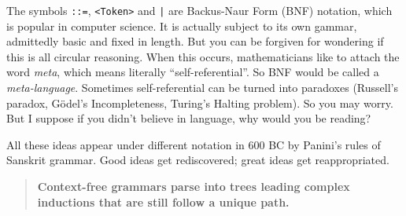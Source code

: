 \begin{remark}
The symbols \lstinline{::=}, \lstinline{<Token>} and \lstinline{|} are 
Backus-Naur Form (BNF) notation, which is popular 
in computer science.  It is actually subject to its own gammar, admittedly 
basic and fixed in length.  But you can be forgiven for wondering if this is 
all circular reasoning.  When this occurs, mathematicians like to attach 
the word \emph{meta}, which means literally ``self-referential''.
So BNF would be called a \emph{meta-language}. Sometimes self-referential 
can be turned into paradoxes (Russell's paradox, G\"odel's Incompleteness,
Turing's Halting problem).  So you may worry.  But I suppose if you 
didn't believe in language, why would you be reading?\\
\end{remark}

All these ideas appear under different notation in 600 BC by Panini's rules of
Sanskrit grammar.  Good ideas get rediscovered; great ideas get reappropriated.



\begin{quote}
    \textbf{Context-free grammars parse into trees leading complex inductions 
    that are still follow a  unique path.}
\end{quote}